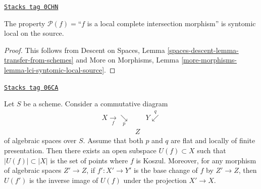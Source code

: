 \begin{lemma}
\label{spaces-more-morphisms-lemma-lci-syntomic-local-source}
\href{https://stacks.math.columbia.edu/tag/0CHN}{\texttt{Stacks tag 0CHN}}

The property $\mathcal{P}(f) =$``$f$ is a local complete intersection
morphism'' is syntomic local on the source.
\end{lemma}

\begin{proof}
This follows from
Descent on Spaces, Lemma \ref{spaces-descent-lemma-transfer-from-schemes} and
More on Morphisms, Lemma \ref{more-morphisms-lemma-lci-syntomic-local-source}.
\end{proof}

\begin{lemma}
\label{spaces-more-morphisms-lemma-base-change-lci-fibres}
\href{https://stacks.math.columbia.edu/tag/06CA}{\texttt{Stacks tag 06CA}}

Let $S$ be a scheme. Consider a commutative diagram
$$
\begin{array}{ccc}X \underset{f}{\longrightarrow}\underset{p}{\searrow} &  & Y \overset{q}{\swarrow} \\  & Z & \end{array}
$$
of algebraic spaces over $S$. Assume that both $p$ and $q$
are flat and locally of finite presentation.
Then there exists an open subspace $U(f) \subset X$
such that $|U(f)| \subset |X|$ is the set of points where $f$ is Koszul.
Moreover, for any morphism of algebraic spaces $Z' \to Z$, if
$f' : X' \to Y'$ is the base change of $f$ by $Z' \to Z$, then
$U(f')$ is the inverse image of $U(f)$ under the projection $X' \to X$.
\end{lemma}

